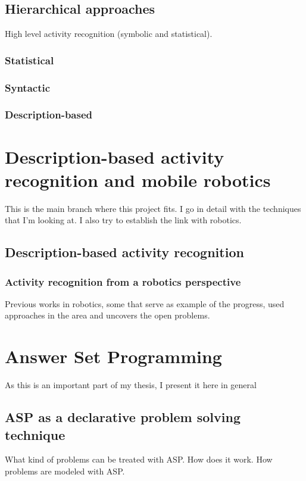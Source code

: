 \documentclass[a4paper, 12pt, openany, oneside]{book}
\begin{document}
\subsection{Hierarchical approaches}
High level activity recognition (symbolic and statistical).
\subsubsection{Statistical}
\subsubsection{Syntactic}
\subsubsection{Description-based} \label{sec_description_ap}

\section{Description-based activity recognition and mobile robotics}
This is the main branch where this project fits.
I go in detail with the techniques that I'm looking at.
I also try to establish the link with robotics.

\subsection{Description-based activity recognition}

\subsubsection{Activity recognition from a robotics perspective}
Previous works in robotics, some that serve as example of the progress, used approaches in the area and uncovers the open problems.

\section{Answer Set Programming} %
As this is an important part of my thesis, I present it here in general

\subsection{ASP as a declarative problem solving technique}
What kind of problems can be treated with ASP.
How does it work.
How problems are modeled with ASP.
\end{document}
